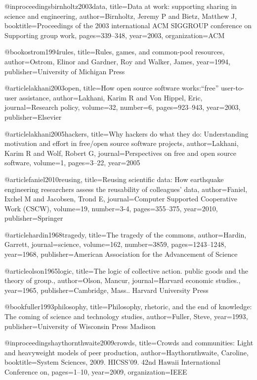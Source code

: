 @inproceedings{birnholtz2003data,
  title={Data at work: supporting sharing in science and engineering},
  author={Birnholtz, Jeremy P and Bietz, Matthew J},
  booktitle={Proceedings of the 2003 international ACM SIGGROUP conference on Supporting group work},
  pages={339--348},
  year={2003},
  organization={ACM}
}

@book{ostrom1994rules,
  title={Rules, games, and common-pool resources},
  author={Ostrom, Elinor and Gardner, Roy and Walker, James},
  year={1994},
  publisher={University of Michigan Press}
}

@article{lakhani2003open,
  title={How open source software works:“free” user-to-user assistance},
  author={Lakhani, Karim R and Von Hippel, Eric},
  journal={Research policy},
  volume={32},
  number={6},
  pages={923--943},
  year={2003},
  publisher={Elsevier}
}

@article{lakhani2005hackers,
  title={Why hackers do what they do: Understanding motivation and effort in free/open source software projects},
  author={Lakhani, Karim R and Wolf, Robert G},
  journal={Perspectives on free and open source software},
  volume={1},
  pages={3--22},
  year={2005}
}

@article{faniel2010reusing,
  title={Reusing scientific data: How earthquake engineering researchers assess the reusability of colleagues’ data},
  author={Faniel, Ixchel M and Jacobsen, Trond E},
  journal={Computer Supported Cooperative Work (CSCW)},
  volume={19},
  number={3-4},
  pages={355--375},
  year={2010},
  publisher={Springer}
}

@article{hardin1968tragedy,
  title={The tragedy of the commons},
  author={Hardin, Garrett},
  journal={science},
  volume={162},
  number={3859},
  pages={1243--1248},
  year={1968},
  publisher={American Association for the Advancement of Science}
}

@article{olson1965logic,
  title={The logic of collective action. public goods and the theory of group.},
  author={Olson, Mancur},
  journal={Harvard economic studies.},
  year={1965},
  publisher={Cambridge, Mass.. Harvard University Press}
}


@book{fuller1993philosophy,
  title={Philosophy, rhetoric, and the end of knowledge: The coming of science and technology studies},
  author={Fuller, Steve},
  year={1993},
  publisher={University of Wisconsin Press Madison}
}

@inproceedings{haythornthwaite2009crowds,
  title={Crowds and communities: Light and heavyweight models of peer production},
  author={Haythornthwaite, Caroline},
  booktitle={System Sciences, 2009. HICSS'09. 42nd Hawaii International Conference on},
  pages={1--10},
  year={2009},
  organization={IEEE}
}

